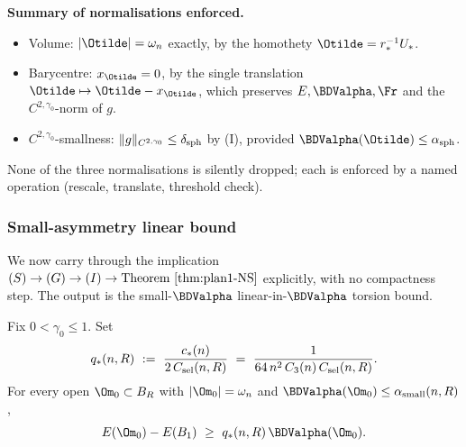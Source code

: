 \medskip\noindent
\textbf{Summary of normalisations enforced.}
\begin{itemize}
   \item Volume: $|\Otilde|=\omega_{n}$ exactly, by the homothety
      $\Otilde=r_{*}^{-1}U_{*}$.
   \item Barycentre: $x_{\Otilde}=0$, by the single translation
      $\Otilde\mapsto\Otilde-x_{\Otilde}$, which preserves
      $E,\BDValpha,\Fr$ and the $C^{2,\gamma_{0}}$-norm of $g$.
   \item $C^{2,\gamma_{0}}$-smallness: $\|g\|_{C^{2,\gamma_{0}}}\le\delta_{\rm sph}$
      by (I), provided $\BDValpha(\Otilde)\le\alpha_{\rm sph}$.
\end{itemize}
None of the three normalisations is silently dropped; each is enforced
by a named operation (rescale, translate, threshold check).

\subsubsection{Small-asymmetry linear bound}
\label{sec:plan1-small-alpha}

We now carry through the implication
\((S)\to(G)\to(I)\to\text{Theorem~\ref{thm:plan1-NS}}\) explicitly, with
no compactness step. The output is the small-$\BDValpha$ linear-in-$\BDValpha$
torsion bound.

\begin{theorem}
\label{thm:plan1-small-alpha}
Fix $0<\gamma_{0}\le 1$. Set
\begin{equation}\label{eq:plan1-qstar}
   q_{*}(n,R)\ :=\
   \frac{c_{*}(n)}{2\,C_{\rm sel}(n,R)}
   \ =\ \frac{1}{64\,n^{2}\,C_{3}(n)\,C_{\rm sel}(n,R)}.
\end{equation}
For every open $\Om_{0}\subset B_{R}$ with $|\Om_{0}|=\omega_{n}$ and
$\BDValpha(\Om_{0})\le\alpha_{\rm small}(n,R)$,
\begin{equation}\label{eq:plan1-small-alpha}
   E(\Om_{0})-E(B_{1})\ \ge\ q_{*}(n,R)\,\BDValpha(\Om_{0}).
\end{equation}
\end{theorem}

